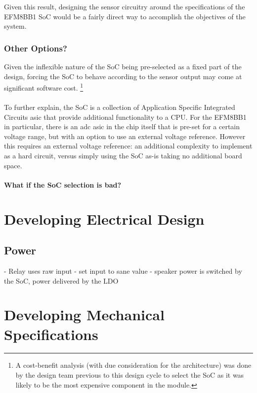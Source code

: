 \documentclass[12pt]{article}
\begin{document}
  Given this result, designing the sensor circuitry around the specifications of the EFM8BB1 SoC would be a fairly direct way to accomplish the objectives of the system.

  \subsubsection{Other Options?}
  Given the inflexible nature of the SoC being pre-selected as a fixed part of the design, forcing the SoC to behave according to the sensor output may come at significant software cost. \footnote{A cost-benefit analysis (with due consideration for the architecture) was done by the design team previous to this design cycle to select the SoC as it was likely to be the most expensive component in the module.}

  \paragraph{}
  To further explain, the SoC is a collection of Application Specific Integrated Circuits \acrshort{asic} that provide additional functionality to a CPU. For the EFM8BB1 in particular, there is an \acrfull{adc} \acrshort{asic} in the chip itself that is pre-set for a certain voltage range, but with an option to use an external voltage reference. However this requires an external voltage reference: an additional complexity to implement as a hard circuit, versus simply using the SoC as-is taking no additional board space.
  
  \paragraph{What if the SoC selection is bad?}

  
	
	
	
	\section{Developing Electrical Design\label{sec:devel-electr-design}} 
	\subsection{Power}
  

  - Relay uses raw input - set input to sane value
  - speaker power is switched by the SoC, power delivered by the LDO
	
	\section{Developing Mechanical Specifications}
	
\end{document}
